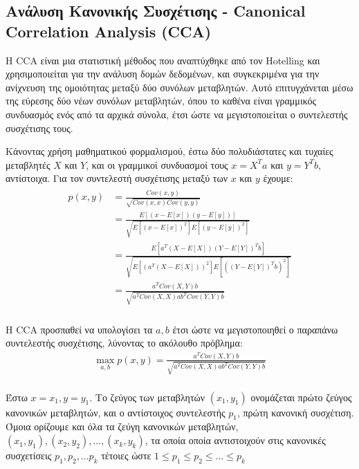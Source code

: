 \documentclass[11pt,a4paper,english,greek,twoside]{../Thesis}
\begin{document}
\subsection{Ανάλυση Κανονικής Συσχέτισης - Canonical Correlation Analysis (CCA)}
\label{subsec:cca_theory}
\par Η CCA είναι μια στατιστική μέθοδος που αναπτύχθηκε από τον Hotelling \cite{Hotelling1936-vk} και χρησιμοποιείται για την ανάλυση δομών δεδομένων, και συγκεκριμένα για την ανίχνευση της ομοιότητας μεταξύ δύο συνόλων μεταβλητών. Αυτό επιτυγχάνεται μέσω της εύρεσης δύο νέων συνόλων μεταβλητών, όπου το καθένα είναι γραμμικός συνδυασμός ενός από τα αρχικά σύνολα, έτσι ώστε να μεγιστοποιείται ο συντελεστής συσχέτισης τους. 
\par Κάνοντας χρήση μαθηματικού φορμαλισμού, έστω δύο πολυδιάστατες και τυχαίες μεταβλητές $X$ και $Y$, και οι γραμμικοί συνδυασμοί τους $x=X^Ta$ και $y=Y^Tb$, αντίστοιχα. Για τον συντελεστή συσχέτισης μεταξύ των $x$ και $y$ έχουμε:
\begin{align}
\begin{split} %
p(x,y)&=\frac{Cov(x,y)}{\sqrt{Cov(x,x)Cov(y,y)}} \\[2ex]
&=\frac{E[(x-E[x])(y-E[y])]}{\sqrt{E[(x-E[x])^2]E[(y-E[y])^2]}} \\[2ex]
&=\frac{E[a^T(X-E[X])(Y-E[Y])^Tb]}{\sqrt{E[(a^T(X-E[X]))^2]E[((Y-E[Y])^Tb)^2]}} \\[2ex]
&=\frac{a^TCov(X,Y)b}{\sqrt{a^TCov(X,X)ab^TCov(Y,Y)b}} \\
\label{eqCCA1}
\end{split}
\end{align}

\par H CCA προσπαθεί να υπολογίσει τα $a, b$ έτσι ώστε να μεγιστοποιηθεί ο παραπάνω συντελεστής συσχέτισης, λύνοντας το ακόλουθο πρόβλημα:
\begin{align}
\max_{a,b}p(x,y)=\frac{a^TCov(X,Y)b}{\sqrt{a^TCov(X,X)ab^TCov(Y,Y)b}} \\
\label{eqCCA2}
\end{align}

\par Έστω $x=x_1,y=y_1$. Το ζεύγος των μεταβλητών $(x_1, y_1)$ ονομάζεται πρώτο ζεύγος κανονικών μεταβλητών, και ο αντίστοιχος συντελεστής $p_1$, πρώτη κανονική συσχέτιση. Όμοια ορίζουμε και όλα τα ζεύγη κανονικών μεταβλητών, $(x_1,y_1),(x_2,y_2),...,(x_k,y_k)$, τα οποία οποία αντιστοιχούν στις κανονικές συσχετίσεις $p_1,p_2,...p_k$ τέτοιες ώστε $1\leq p_1\leq p_2\leq ... \leq p_k$
\end{document}

